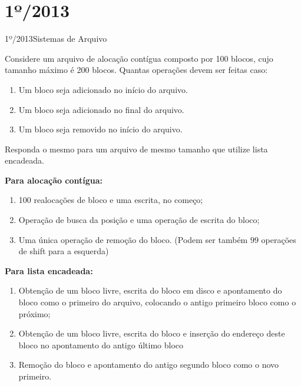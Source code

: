 \section{1º/2013}
\begin{exercicio}
  {1º/2013}{Sistemas de Arquivo}
  {Considere um arquivo de alocação contígua composto por 100 blocos, cujo tamanho máximo é 200 blocos. Quantas operações devem ser feitas caso:
  \begin{enumerate}
    \item Um bloco seja adicionado no início do arquivo.
    \item Um bloco seja adicionado no final do arquivo.
    \item Um bloco seja removido no início do arquivo.
  \end{enumerate}
  Responda o mesmo para um arquivo de mesmo tamanho que utilize lista encadeada.}

  \textbf{Para alocação contígua:}
  \begin{enumerate}
    \item 100 realocações de bloco e uma escrita, no começo;

    \item Operação de busca da posição e uma operação de escrita do bloco;

    \item Uma única operação de remoção do bloco. (Podem ser também $99$ operações de shift para a esquerda)
  \end{enumerate}

  \textbf{Para lista encadeada:}
  \begin{enumerate}
    \item Obtenção de um bloco livre, escrita do bloco em disco e apontamento do bloco como o primeiro do arquivo, colocando o antigo primeiro bloco como o próximo;

    \item Obtenção de um bloco livre, escrita do bloco e inserção do endereço deste bloco no apontamento do antigo último bloco

    \item Remoção do bloco e apontamento do antigo segundo bloco como o novo primeiro.
  \end{enumerate}
\end{exercicio}

